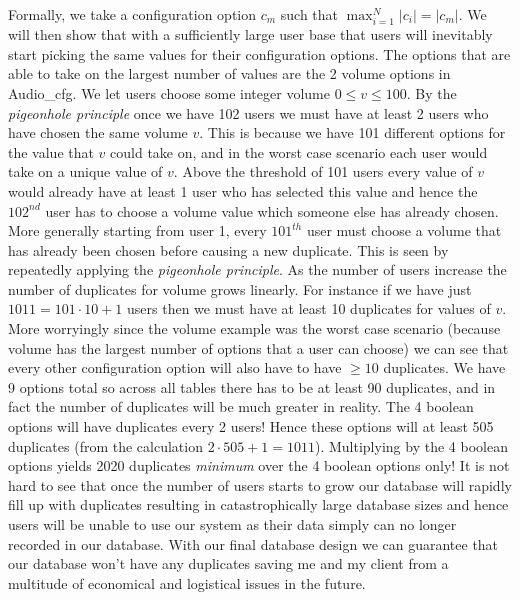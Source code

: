 Formally, we
take a configuration option $c_m$ such that
$\max_{i=1}^{N} |c_i| = |c_m|$. We will then show that with a 
sufficiently large user base that users will inevitably start
picking the same values for their configuration options. The 
options that are able to take on the largest number of values 
are the 2 volume options in {\sffamily Audio\_cfg}. We let 
users choose some integer volume $0 \leq v \leq 100$. By the 
\textit{pigeonhole principle} once we have 102 users we 
must have at least 2 users who have chosen the same 
volume $v$. This is because we have 101 different options for 
the value that $v$ could take on, and in the worst case 
scenario each user would take on a unique value of $v$. Above
the threshold of 101 users every value of $v$ would already 
have at least 1 user who has selected this value and hence the
$102^{nd}$ user has to choose a volume value which someone else
has already chosen. More generally starting from user 1, every
$101^{th}$ user must choose a volume that has already been 
chosen before causing a new duplicate. This is seen by 
repeatedly applying the \textit{pigeonhole principle}. As the
number of users increase the number of duplicates for volume
grows linearly. For instance if we have just 
$1011 = 101 \cdot 10 + 1$ users then we must
have at least 10 duplicates for values of $v$. More worryingly
since the volume example was the worst case scenario (because
volume has the largest number of options that a user can 
choose) we can see that every other configuration option will 
also have to have $\geq 10$ duplicates. We have 9 options 
total so across all tables there has to be at least 90
duplicates, and in fact the number of duplicates will be much 
greater in reality. The 4 boolean options will have
duplicates every 2 users! Hence these options will at least
505 duplicates (from the calculation $2 \cdot 505 + 1 = 1011$).
Multiplying by the 4 boolean options yields 2020 duplicates
\textit{minimum} over the 4 boolean options only! It is not 
hard to see that once the number of users starts to grow our
database will rapidly fill up with duplicates resulting in
catastrophically large database sizes and hence users will be
unable to use our system as their data simply can no longer  
recorded in our database. With our final database design we 
can guarantee that our database won't have any duplicates 
saving me and my client from a multitude of economical and 
logistical issues in the future. \\ \vspace{0.2cm}

